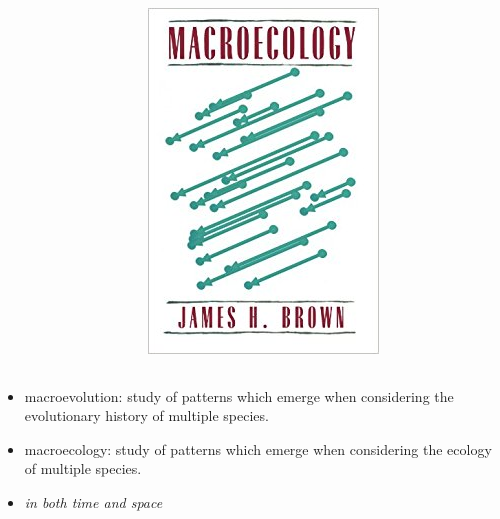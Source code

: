 \documentclass{beamer}
\begin{document}
\begin{frame}
\begin{columns}
\begin{column}{0.5\textwidth}
\begin{center}
      \end{center}
    \end{column}
    \begin{column}{0.5\textwidth}
      \begin{center}
        \includegraphics[height=0.8\textheight,width=\textwidth,keepaspectratio=true]{figure/brown_macro}
      \end{center}
    \end{column}
  \end{columns}
\end{frame}

\begin{frame}
  \begin{definition}
    \begin{itemize}
      \item \alert{macroevolution}: study of patterns which emerge when considering the evolutionary history of multiple species.
      \item \alert{macroecology}: study of patterns which emerge when considering the ecology of multiple species.
      \item \emph{in both time and space}
    \end{itemize}
  \end{definition}
\end{frame}
\end{document}
